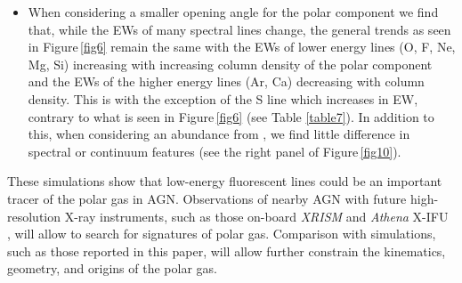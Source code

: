 \documentclass[fleqn,usenatbib]{mnras}
\begin{document}
\begin{itemize}
            \item When considering a smaller opening angle for the polar component we find that, while the EWs of many spectral lines change, the general trends as seen in Figure\,\ref{fig6} remain the same with the EWs of lower energy lines (O, F, Ne, Mg, Si) increasing with increasing column density of the polar component and the EWs of the higher energy lines (Ar, Ca) decreasing with column density. This is with the exception of the S line which increases in EW, contrary to what is seen in Figure\,\ref{fig6} (see Table \ref{table7}). In addition to this, when considering an abundance from \cite{2003ApJ...591.1220L}, we find little difference in spectral or continuum features (see the right panel of Figure\,\ref{fig10}).  
        \end{itemize}
        
        These simulations show that low-energy fluorescent lines could be an important tracer of the polar gas in AGN. Observations of nearby AGN with future high-resolution X-ray instruments, such as those on-board {\it XRISM} \citep{xrismscienceteam2020science} and {\it Athena} X-IFU \citep{2016SPIE.9905E..2FB}, will allow to search for signatures of polar gas. Comparison with simulations, such as those reported in this paper, will allow further constrain the kinematics, geometry, and origins of the polar gas.  
        


\end{document}
